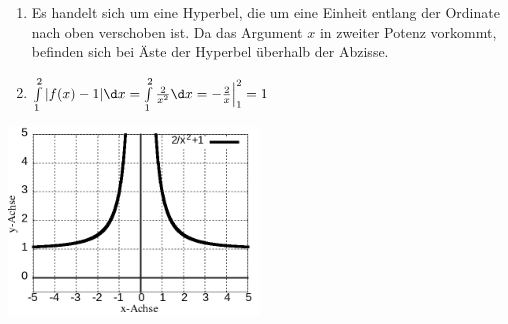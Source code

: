 \item

\begin{enumerate}
\item Es handelt sich um eine Hyperbel, die um eine Einheit entlang der Ordinate nach oben verschoben ist. Da das Argument $x$ in zweiter Potenz vorkommt, befinden sich bei Äste der Hyperbel überhalb der Abzisse.
\item $\int\limits_1^2 |f(x)-1| \d x = \int\limits_1^2 \frac{2}{x^2} \d x = -\frac{2}{x} \Big|_1^2 = 1$
\end{enumerate}

\includegraphics[width=0.5\textwidth]{../tex-snippets/ex-integral-6-img-a.png}
